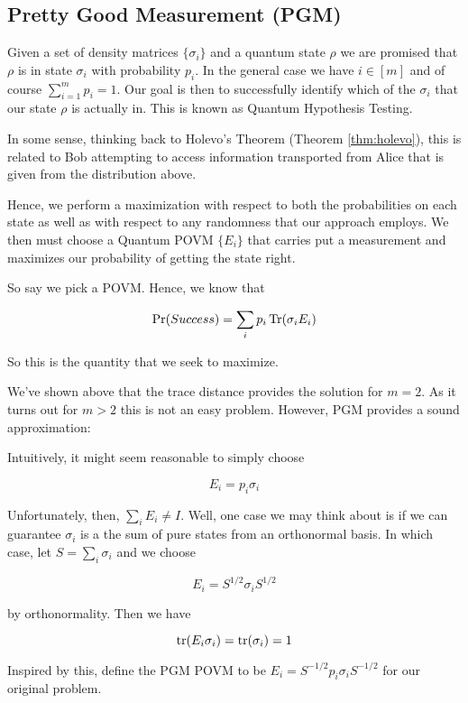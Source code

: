 \documentclass[main.tex]{subfiles}
\begin{document}
\begin{subappendices}
\subsection{Pretty Good Measurement (PGM)}

Given a set of density matrices $\{\sigma_i\}$ and a quantum state $\rho$ we are promised that $\rho$ is in state $\sigma_i$ with probability $p_i$. In the general case we have $i \in [m]$ and of course $\sum_{i=1}^m p_i = 1$. Our goal is then to successfully identify which of the $\sigma_i$ that our state $\rho$ is actually in. This is known as Quantum Hypothesis Testing. 

In some sense, thinking back to Holevo's Theorem (Theorem \ref{thm:holevo}), this is related to Bob attempting to access information transported from Alice that is given from the distribution above.

Hence, we perform a maximization with respect to both the probabilities on each state as well as with respect to any randomness that our approach employs. We then must choose a Quantum POVM $\{E_i\}$ that carries put a measurement and maximizes our probability of getting the state right.

So say we pick a POVM. Hence, we know that

\begin{align*}
\Pr(Success)= \sum_i p_i \Tr (\sigma_i E_i)
\end{align*}


So this is the quantity that we seek to maximize. 

We've shown above that the trace distance provides the solution for $m=2$. As it turns out for $m>2$ this is not an easy problem. However, PGM provides a sound approximation:

Intuitively, it might seem reasonable to simply choose 

$$E_i = p_i \sigma_i$$

Unfortunately, then, $\sum_i E_i \neq I$. Well, one case we may think about is if we can guarantee $\sigma_i$ is a the sum of pure states from an orthonormal basis. In which case, let $S = \sum_i \sigma_i$ and we choose 

$$E_i = S^{1/2} \sigma_i S^{1/2} $$ 

by orthonormality. Then we have

$$
\tr(E_i \sigma_i) = \tr(\sigma_i) = 1
$$

Inspired by this, define the PGM POVM to be $E_i = S^{-1/2}p_i \sigma_i S^{-1/2}$ for our original problem.


\end{subappendices}
\end{document}
